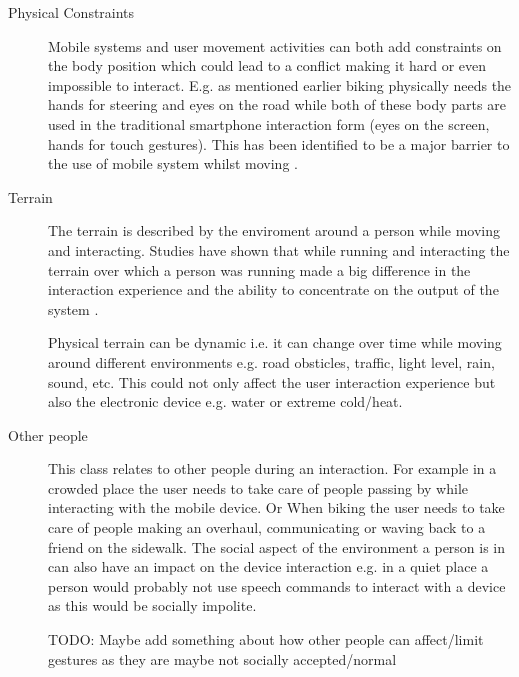 \begin{description}



\item[Physical Constraints]
Mobile systems and user movement activities can both add constraints on the body position which could lead to a conflict making it hard or even impossible to interact. E.g. as mentioned earlier biking physically needs the hands for steering and eyes on the road while both of these body parts are used in the traditional smartphone interaction form (eyes on the screen, hands for touch gestures). This has been identified to be a major barrier to the use of mobile system whilst moving \cite{pielot_pocketmenu:_2012}.

\item[Terrain]
The terrain is described by the enviroment around a person while moving and interacting. Studies have shown that while running and interacting the terrain over which a person was running made a big difference in the interaction experience and the ability to concentrate on the output of the system \cite{marshall_using_2011}.

Physical terrain can be dynamic i.e. it can change over time while moving around different environments e.g. road obsticles, traffic, light level, rain, sound, etc. This could not only affect the user interaction experience but also the electronic device e.g. water or extreme cold/heat.

\item[Other people]
This class relates to other people during an interaction. For example in a crowded place the user needs to take care of people passing by while interacting with the mobile device. Or When biking the user needs to take care of people making an overhaul, communicating or waving back to a friend on the sidewalk. The social aspect of the environment a person is in can also have an impact on the device interaction e.g. in a quiet place a person would probably not use speech commands to interact with a device as this would be socially impolite.

TODO: Maybe add something about how other people can affect/limit gestures as they are maybe not socially accepted/normal
\end{description}


